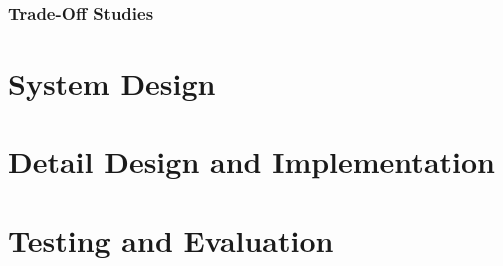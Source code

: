 \documentclass[a4paper,12pt]{article}
\numberwithin{equation}{section}
\numberwithin{figure}{section}
\numberwithin{table}{section}
\begin{document}
\subsubsection{Trade-Off Studies}

















\newpage
\section{System Design}





\newpage
\section{Detail Design and Implementation}






\newpage
\section{Testing and Evaluation}
\end{document}
